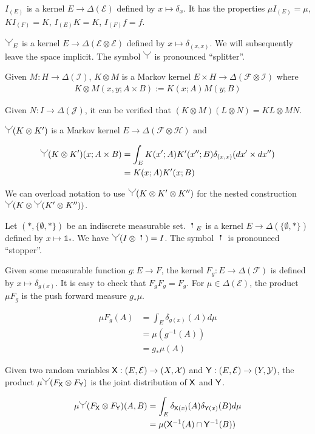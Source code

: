 $I_{(E)}$ is a kernel $E\to \Delta(\mathcal{E})$ defined by $x\mapsto \delta_x$. It has the properties $\mu I_{(E)}=\mu$, $KI_{(F)} = K$, $I_{(E)} K = K$, $I_{(F)} f=f$.

$\splitter{0.15}_E$ is a kernel $E\to \Delta(\mathcal{E}\otimes\mathcal{E})$ defined by $x\mapsto \delta_{(x,x)}$. We will subsequently leave the space implicit. The symbol $\splitter{0.15}$ is pronounced ``splitter''.

Given $M:H\to \Delta(\mathcal{I})$, $K\otimes M$ is a Markov kernel $E\times H\to \Delta(\mathcal{F}\otimes\mathcal{I})$ where
\begin{align}
    K\otimes M(x,y;A\times B) := K(x;A) M(y;B)
\end{align}

Given $N:I\to \Delta(\mathcal{J})$, it can be verified that $(K\otimes M)(L\otimes N)=KL\otimes MN$.

$\splitter{0.15}(K\otimes K')$ is a Markov kernel $E\to \Delta(\mathcal{F}\otimes\mathcal{H})$ and

\begin{align}
    \splitter{0.15}(K\otimes K')(x;A\times B) &= \int_E K(x';A)K'(x'';B) \delta_{(x,x)} (dx'\times dx'')\\ 
                                              &= K(x;A)K'(x;B) \label{eq:outer_product}
\end{align}

We can overload notation to use $\splitter{0.15}(K\otimes K'\otimes K'')$ for the nested construction $\splitter{0.15}(K\otimes \splitter{0.15}(K'\otimes K''))$. 

Let $(*,\{\emptyset,*\})$ be an indiscrete measurable set. $\stopper{0.15}_E$ is a kernel $E\to \Delta(\{\emptyset,*\})$ defined by $x\mapsto \mathds{1}_*$. We have $\splitter{0.15}(I\otimes \stopper{0.15}) = I$. The symbol $\stopper{0.15}$ is pronounced ``stopper''.

Given some measurable function $g:E\to F$, the kernel $F_g:E\to \Delta(\mathcal{F})$ is defined by $x\mapsto \delta_{g(x)}$. It is easy to check that $F_g F_g = F_g$. For $\mu\in \Delta(\mathcal{E})$, the product $\mu F_g$ is the push forward measure $g_*\mu$.

\begin{align}
    \mu F_g (A) &= \int_E \delta_{g(x)}(A) d\mu\\
                &= \mu(g^{-1}(A))\\
                &= g_*\mu(A)
\end{align}

Given two random variables $\mathsf{X}:(E,\mathcal{E})\to (X,\mathcal{X})$ and $\mathsf{Y}:(E,\mathcal{E})\to (Y,\mathcal{Y})$, the product $\mu\splitter{0.15}(F_{\RV{X}}\otimes F_{\RV{Y}})$ is the joint distribution of $\mathsf{X}$ and $\mathsf{Y}$.

\begin{align}
    \mu \splitter{0.15}(F_{\RV{X}}\otimes F_{\RV{Y}}) (A, B) &= \int_E \delta_{\RV{X}(x)}(A) \delta_{\RV{Y}(x)}(B) d\mu \\
                        &= \mu(\RV{X}^{-1}(A)\cap \RV{Y}^{-1}(B))
\end{align}
